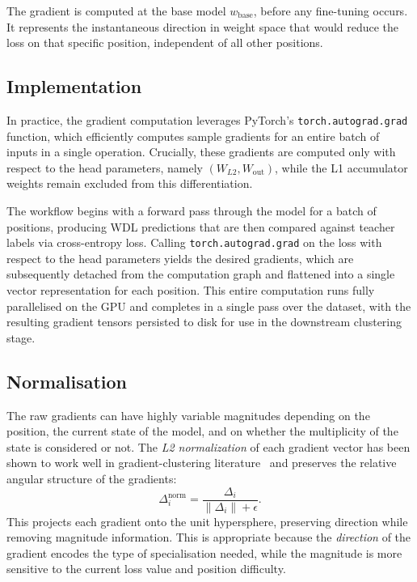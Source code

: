 The gradient is computed at the base model \(w_{\mathrm{base}}\), before any fine-tuning occurs. It represents the instantaneous direction in weight space that would reduce the loss on that specific position, independent of all other positions.

\subsection{Implementation}\label{sec:sg-impl}

In practice, the gradient computation leverages PyTorch's \texttt{torch.autograd.grad} function, which efficiently computes sample gradients for an entire batch of inputs in a single operation. Crucially, these gradients are computed only with respect to the head parameters, namely \((W_{L2}, W_{\mathrm{out}})\), while the L1 accumulator weights remain excluded from this differentiation.

The workflow begins with a forward pass through the model for a batch of positions, producing WDL predictions that are then compared against teacher labels via cross-entropy loss. Calling \texttt{torch.autograd.grad} on the loss with respect to the head parameters yields the desired gradients, which are subsequently detached from the computation graph and flattened into a single vector representation for each position. This entire computation runs fully parallelised on the GPU and completes in a single pass over the dataset, with the resulting gradient tensors persisted to disk for use in the downstream clustering stage.

\subsection{Normalisation}\label{sec:sg-norm}

The raw gradients can have highly variable magnitudes depending on the position, the current state of the model, and on whether the multiplicity of the state is considered or not. The \emph{L2 normalization} of each gradient vector has been shown to work well in gradient-clustering literature~\cite{li2025elrea,sridharan2025gradientspace} and preserves the relative angular structure of the gradients:
\[
\Delta_i^{\mathrm{norm}} = \frac{\Delta_i}{\lVert\Delta_i\rVert + \epsilon}.
\]
This projects each gradient onto the unit hypersphere, preserving direction while removing magnitude information. This is appropriate because the \emph{direction} of the gradient encodes the type of specialisation needed, while the magnitude is more sensitive to the current loss value and position difficulty.

